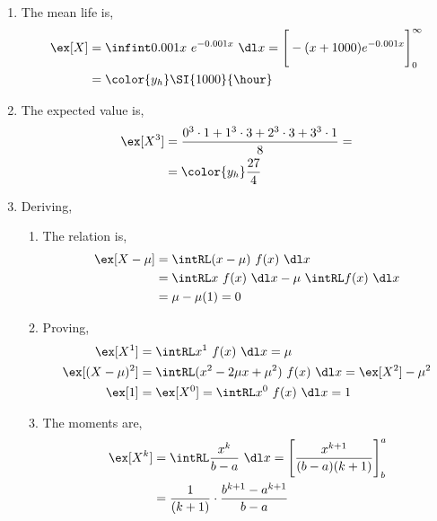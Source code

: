 \begin{enumerate}
    \item The mean life is,
          \begin{align}
              \ex[X] & = \infint 0.001x\ e^{-0.001x}\ \dl x
              = \Bigg[-(x + 1000)e^{-0.001x}\Bigg]_0^{\infty} \\
                     & = \color{y_h} \SI{1000}{\hour}
          \end{align}

    \item The expected value is,
          \begin{align}
              \ex[X^3] & = \frac{0^3 \cdot 1 + 1^3 \cdot 3 + 2^3 \cdot 3
              + 3^3 \cdot 1}{8} =                                        \\
                       & = \color{y_h} \frac{27}{4}
          \end{align}

    \item Deriving,
          \begin{enumerate}
              \item The relation is,
                    \begin{align}
                        \ex[X-\mu] & = \intRL (x-\mu)\ f(x)\ \dl x                     \\
                                   & = \intRL x\ f(x)\ \dl x - \mu\ \intRL f(x)\ \dl x \\
                                   & = \mu - \mu(1) = 0
                    \end{align}

              \item Proving,
                    \begin{align}
                        \ex[X^1]       & = \intRL x^1\ f(x)\ \dl x = \mu              \\
                        \ex[(X-\mu)^2] & = \intRL (x^2 - 2\mu x + \mu^2)\ f(x)\ \dl x
                        = \ex[X^2] - \mu^2                                            \\
                        \ex[1]         & = \ex[X^0] = \intRL x^0\ f(x)\ \dl x = 1
                    \end{align}

              \item The moments are,
                    \begin{align}
                        \ex[X^k] & = \intRL \frac{x^k}{b-a}\ \dl x
                        = \Bigg[\frac{x^{k+1}}{(b-a)(k+1)}\Bigg]_b^a                \\
                                 & = \frac{1}{(k+1)} \cdot \frac{b^{k+1} - a^{k+1}}
                        {b-a}
                    \end{align}


\end{enumerate}
\end{enumerate}

